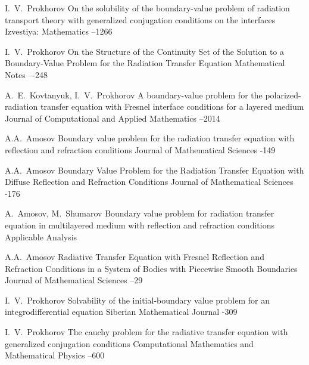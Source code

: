 \documentclass[12pt,reqno]{report}
\begin{document}
{\begin{thebibliography}{1}
 \by   I.~V.~Prokhorov \paper 
On the solubility of the boundary-value problem of radiation transport theory with generalized conjugation conditions on the interfaces
\jour Izvestiya: Mathematics
--1266
\

 \by I.~V.~Prokhorov \paper On the Structure of the Continuity Set of the Solution to a Boundary-Value Problem for the Radiation Transfer Equation \jour Mathematical Notes    –-248



 \by A.~E.~Kovtanyuk, I.~V.~Prokhorov \paper A
boundary-value problem for the polarized-radiation transfer
equation with Fresnel interface conditions for a layered medium
\jour Journal of Computational and Applied Mathematics 
  --2014


 \by A.A.~Amosov \paper Boundary value problem for the radiation transfer equation with
reflection and refraction conditions \jour Journal of Mathematical
Sciences     -149

 \by A.A.~Amosov \paper Boundary Value Problem for the Radiation Transfer Equation with
Diffuse Reflection and Refraction Conditions \jour Journal of
Mathematical Sciences     -176

 \by  A.~Amosov,  M.~Shumarov \paper
Boundary value problem for radiation transfer equation in multilayered medium with reflection and refraction conditions
\jour Applicable Analysis     

  \by A.A.~Amosov \paper Radiative Transfer Equation with Fresnel Reflection and Refraction Conditions in a System of Bodies with Piecewise Smooth Boundaries
 \jour Journal of Mathematical Sciences  
--29





 \by I.~V.~Prokhorov  \paper Solvability of the initial-boundary value problem for an integrodifferential equation
\jour Siberian Mathematical Journal   
-309


 \by \by I.~V.~Prokhorov  \paper  The cauchy problem for the radiative transfer equation with generalized conjugation conditions \jour Computational Mathematics and Mathematical Physics  
 --600


\end{thebibliography}}
\end{document}
